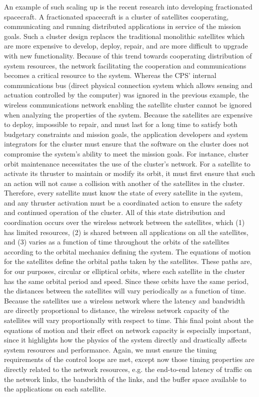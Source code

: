 An example of such scaling up is the recent research into developing
fractionated spacecraft\cite{fractionated_spacecraft}.  A fractionated
spacecraft is a cluster of satellites cooperating, communicating and
running distributed applications in service of the mission goals.
Such a cluster design replaces the traditional monolithic satellites
which are more expensive to develop, deploy, repair, and are more
difficult to upgrade with new functionality.  Because of this trend
towards cooperating distribution of system resources, the network
facilitating the cooperation and communications becomes a critical
resource to the system.  Whereas the CPS' internal communications bus
(direct physical connection system which allows sensing and actuation
controlled by the computer) was ignored in the previous example, the
wireless communications network enabling the satellite cluster cannot
be ignored when analyzing the properties of the system.  Because the
satellites are expensive to deploy, impossible to repair, and must
last for a long time to satisfy both budgetary constraints and mission
goals, the application developers and system integrators for the
cluster must ensure that the software on the cluster does not
compromise the system's ability to meet the mission goals.  For
instance, cluster orbit maintenance necessitates the use of the
cluster's network.  For a satellite to activate its thruster to
maintain or modify its orbit, it must first ensure that such an action
will not cause a collision with another of the satellites in the
cluster.  Therefore, every satellite must know the state of every
satellite in the system, and any thruster activation must be a
coordinated action to ensure the safety and continued operation of the
cluster.  All of this state distribution and coordination occurs over
the wireless network between the satellites, which (1) has limited
resources, (2) is shared between all applications on all the
satellites, and (3) varies as a function of time throughout the orbits
of the satellites according to the orbital mechanics defining the
system.  The equations of motion for the satellites define the orbital
paths taken by the satellites\cite{fundamentals_astrodynamics}.  These
paths are, for our purposes, circular or elliptical orbits, where each
satellite in the cluster has the same orbital period and speed.  Since
these orbits have the same period, the distances between the
satellites will vary periodically as a function of time.  Because the
satellites use a wireless network where the latency and bandwidth are
directly proportional to distance, the wireless network capacity of
the satellites will vary proportionally with respect to time.  This
final point about the equations of motion and their effect on network
capacity is especially important, since it highlights how the physics
of the system directly and drastically affects system resources and
performance.  Again, we must ensure the timing requirements of the
control loops are met, except now those timing properties are directly
related to the network resources, e.g. the end-to-end latency of
traffic on the network links, the bandwidth of the links, and the
buffer space available to the applications on each satellite.


